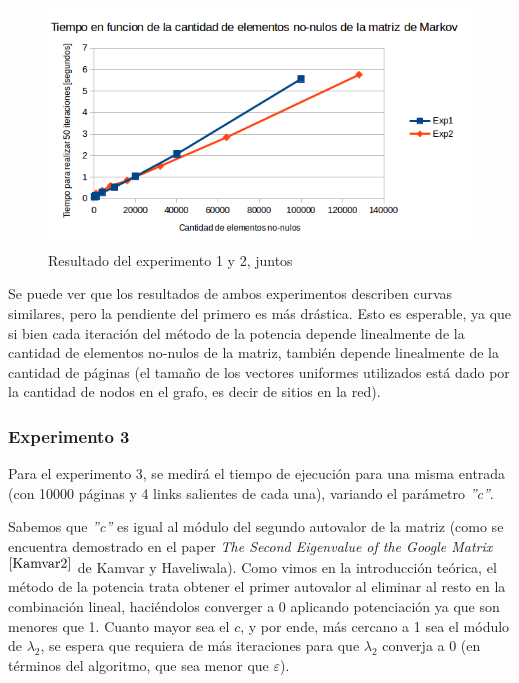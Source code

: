 \begin{figure}[ht]
\begin{center}
\includegraphics[width=0.8\columnwidth]{imagenes/graf6}
\caption{Resultado del experimento 1 y 2, juntos}
\label{fig:res1y2}
\end{center}
\end{figure}
\FloatBarrier

\par Se puede ver que los resultados de ambos experimentos describen curvas similares, pero la pendiente del primero es m\'as dr\'astica.
Esto es esperable, ya que si bien cada iteraci\'on del m\'etodo de la potencia depende linealmente de la cantidad de elementos no-nulos de la matriz,
tambi\'en depende linealmente de la cantidad de p\'aginas (el tama\~no de los vectores uniformes utilizados est\'a dado por la cantidad de nodos en el grafo, es decir de sitios en la red).

\subsubsection{Experimento 3}
\par Para el experimento 3, se medir\'a el tiempo de ejecuci\'on para una misma entrada (con 10000 p\'aginas y 4 links salientes de cada una), variando el par\'ametro \textit{''c''}.
\par Sabemos que \textit{''c''} es igual al módulo del segundo autovalor de la matriz
(como se encuentra demostrado en el paper \emph{The Second Eigenvalue of the Google Matrix}$^{\cite{Kamvar2}}$ de Kamvar y Haveliwala). Como vimos en la introducción teórica, el m\'etodo de la potencia trata obtener el primer autovalor al eliminar al resto en la combinaci\'on lineal, haciéndolos converger a 0 aplicando potenciación ya que son menores que 1. 
Cuanto mayor sea el $c$, y por ende, más cercano a 1 sea el módulo de $\lambda_2$, se espera que requiera de m\'as iteraciones para que $\lambda_2$ converja a 0 (en términos del algoritmo, que sea menor que $\varepsilon$).

